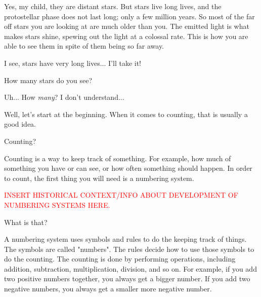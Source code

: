 \documentclass[main.tex]{subfiles}
\begin{document}
\par \Pleione Yes, my child, they are distant stars.  But stars live long lives, and the protostellar phase does not last long; only a few million years.  So most of the far off stars you are looking at are much older than you.  The emitted light is what makes stars shine, spewing out the light at a colossal rate.  This is how you are able to see them in spite of them being so far away.  

\par \Maia I see, stars have very long lives...  I'll take it!  

\par \Pleione How many stars do you see?

\par \Maia Uh... How \textit{many}?  I don't understand...

\par \Pleione Well, let's start at the beginning.  When it comes to counting, that is usually a good idea.

\par \Maia Counting?

\par \Pleione  Counting is a way to keep track of something.  For example, how much of something you have or can see, or how often something should happen.  In order to count, the first thing you will need is a numbering system.

\begin{tcolorbox}[sharp corners, colback=red!30, colframe=red!80!blue, title=Numbering Systems]
\par \textcolor{red} {INSERT HISTORICAL CONTEXT/INFO ABOUT DEVELOPMENT OF NUMBERING SYSTEMS HERE.}
\end{tcolorbox}

\par \Maia What is that?

\par \Pleione A numbering system uses symbols and rules to do the keeping track of things.  The symbols are called "numbers".  The rules decide how to use those symbols to do the counting.  The counting is done by performing operations, including addition, subtraction, multiplication, division, and so on.  For example, if you add two positive numbers together, you always get a bigger number.  If you add two negative numbers, you always get a smaller more negative number.  
\end{document}
